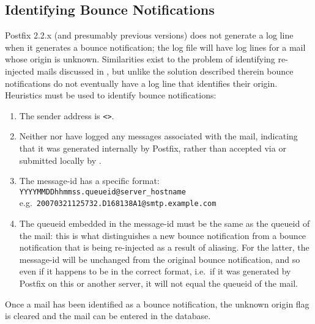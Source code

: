 \subsection{Identifying Bounce Notifications}

\label{identifying bounce notifications}

Postfix 2.2.x (and presumably previous versions) does not generate a log
line when it generates a bounce notification; the log file will have log
lines for a mail whose origin is unknown.  Similarities exist to the
problem of identifying re-injected mails discussed in , but unlike the solution described therein bounce
notifications do not eventually have a log line that identifies their
origin.  Heuristics must be used to identify bounce notifications:

\begin{enumerate}

    \item The sender address is \verb!<>!.\glsadd{<>}

    \item Neither  nor  have logged any
        messages associated with the mail, indicating that it was generated
        internally by Postfix, rather than accepted via  or
        submitted locally by .

    \item The message-id has a specific format: \newline{}
        \tab{} \texttt{YYYYMMDDhhmmss.queueid@server\_hostname} \newline{}
        e.g.\ \texttt{20070321125732.D168138A1@smtp.example.com}

    \item The queueid embedded in the message-id must be the same as the
        queueid of the mail: this is what distinguishes a new bounce
        notification from a bounce notification that is being re-injected
        as a result of aliasing.  For the latter, the message-id will be
        unchanged from the original bounce notification, and so even if it
        happens to be in the correct format, i.e.\ if it was generated by
        Postfix on this or another server, it will not equal the queueid of
        the mail.

\end{enumerate}

Once a mail has been identified as a bounce notification, the unknown
origin flag is cleared and the mail can be entered in the database.

